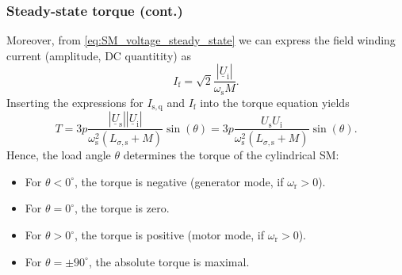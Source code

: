 \begin{frame}
	\frametitle{Steady-state torque (cont.)} 
	\onslide<+->
	Moreover, from \eqref{eq:SM_voltage_steady_state} we can express the field winding current (amplitude, DC quantitity) as
	\begin{equation}
		I_\mathrm{f} = \sqrt{2}\frac{\left|\underline{U}_\mathrm{i}\right|}{\omega_\mathrm{s}M}.
	\end{equation}
	\onslide<+->
	Inserting the expressions for $I_\mathrm{s,q}$ and $I_\mathrm{f}$ into the torque equation yields
	\begin{equation}
		T = 3 p \frac{\left|\underline{U}_\mathrm{s}\right| \left|\underline{U}_\mathrm{i}\right|}{\omega_\mathrm{s}^2 \left(L_{\sigma,\mathrm{s}} + M\right)}  \sin(\theta)  = 3 p \frac{U_\mathrm{s} U_\mathrm{i}}{\omega_\mathrm{s}^2 \left(L_{\sigma,\mathrm{s}} + M\right)}  \sin(\theta). 
		\label{eq:SM_torque_steady_state}
	\end{equation}
	\onslide<+->
	Hence, the load angle $\theta$ determines the torque of the cylindrical SM:
	\begin{itemize}
		\item<+-> For $\theta < 0^\circ$, the torque is negative (generator mode, if $\omega_\mathrm{r}>0$).
		\item<+-> For $\theta = 0^\circ$, the torque is zero.
		\item<+-> For $\theta > 0^\circ$, the torque is positive (motor mode, if $\omega_\mathrm{r}>0$).
		\item<+-> For $\theta = \pm 90^\circ$, the absolute torque is maximal.
	\end{itemize}
\end{frame}

